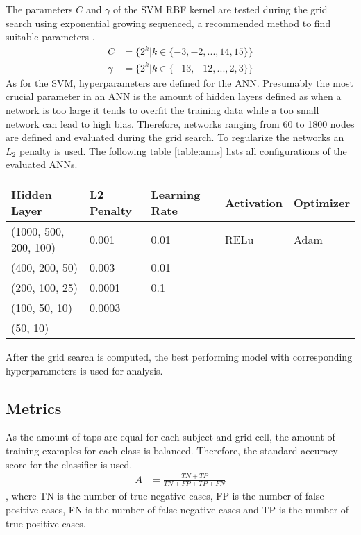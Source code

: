 The parameters $C$ and $\gamma$ of the SVM RBF kernel are tested during the grid search using exponential growing sequenced, a recommended method to find suitable parameters \cite{hsu2003practical}.
\begin{align}
  C &= \{ 2^{k} | k \in \{-3, -2, ..., 14, 15\} \}\\ 
  \gamma &= \{ 2^{k} | k \in \{-13, -12, ..., 2, 3\} \}
\end{align}
As for the SVM, hyperparameters are defined for the ANN. Presumably the most crucial parameter in an ANN is the amount of hidden layers defined as when a network is too large it tends to overfit the training data while a too small network can lead to high bias. Therefore, networks ranging from 60 to 1800 nodes are defined and evaluated during the grid search. To regularize the networks an $L_2$ penalty \cite{ng2004feature} is used. The following table \ref{table:anns} lists all configurations of the evaluated ANNs.

\begin{center}
  \begin{tabular}{ | l | l | l | l | l |}
  \hline
  Hidden Layer & L2 Penalty & Learning Rate & Activation & Optimizer \\ \hline
  (1000, 500, 200, 100) & 0.001 & 0.01 & RELu & Adam \cite{DBLP:journals/corr/KingmaB14} \\
  (400, 200, 50) & 0.003 & 0.01 & & \\
  (200, 100, 25) & 0.0001 & 0.1 & & \\
  (100, 50, 10) & 0.0003 & & & \\
  (50, 10) & & & & \\
  \hline
  \end{tabular}
  \label{table:anns}
\end{center}

After the grid search is computed, the best performing model with corresponding hyperparameters is used for analysis.
\subsection{Metrics}
As the amount of taps are equal for each subject and grid cell, the amount of training examples for each class is balanced. Therefore, the standard accuracy score for the classifier is used.
\begin{align}
  A &= \frac{TN + TP}{TN + FP + TP + FN} 
\end{align},
where TN is the number of true negative cases, FP is the number of false positive cases, FN is the number of false negative cases and TP is the number of true positive cases.
\raggedbottom





